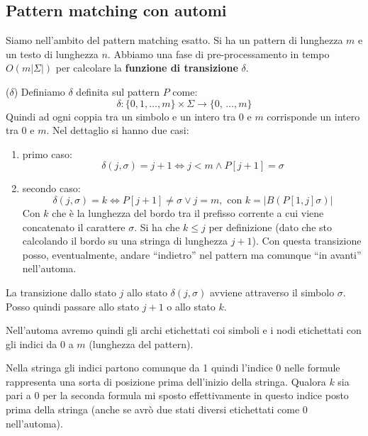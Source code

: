 \subsection{Pattern matching con automi}
Siamo nell'ambito del pattern matching esatto. Si ha un pattern di lunghezza $m$ e un testo di lunghezza $n$. Abbiamo una fase di pre-processamento in tempo $O(m|\Sigma|)$ per calcolare la
\textbf{funzione di transizione }$\delta$.\\
\begin{definizione}($\delta$)
  Definiamo $\delta$ definita sul pattern $P$ come:
\[\delta:\{0,1,\ldots, m\}\times \Sigma\to\{0,\,\ldots, m\}\]
Quindi ad ogni coppia tra un simbolo e un intero tra 0 e $m$ corrisponde un
intero tra 0 e $m$. Nel dettaglio si hanno due casi:
\begin{enumerate}
  \item primo caso:
  \[\delta(j,\sigma)=j+1\iff j<m\land P[j+1]=\sigma\]

  \item secondo caso:
  \[\delta(j,\sigma)=k\iff P[j+1]\neq \sigma \lor j=m,\mbox{ con
    }k=|B(P[1,j]\sigma)|\]
  Con $k$ che è la lunghezza del bordo tra il prefisso corrente a cui viene
  concatenato il carattere $\sigma$. Si ha che $k\leq j$ per definizione (dato
  che sto calcolando il bordo su una stringa di lunghezza $j+1$). Con questa 
  transizione posso, eventualmente, andare ``indietro'' nel pattern ma comunque
  ``in avanti'' nell'automa.
\end{enumerate}
\end{definizione}
\begin{nota}
La transizione dallo stato $j$ allo stato $\delta(j,\sigma)$ avviene attraverso
il simbolo $\sigma$. Posso quindi passare allo stato $j+1$ o allo stato $k$.\\
\end{nota}
\begin{nota}
Nell'automa avremo quindi gli archi etichettati coi simboli e i nodi etichettati con gli indici da 0 a $m$ (lunghezza del pattern). 
\end{nota}
\begin{nota}
Nella stringa gli indici partono comunque da 1 quindi l'indice 0 nelle formule
rappresenta una sorta di posizione prima dell'inizio della stringa. Qualora $k$
sia pari a 0 per la seconda formula mi sposto effettivamente in questo indice
posto prima della stringa (anche se avrò due stati diversi etichettati come 0
nell'automa).
\end{nota}
